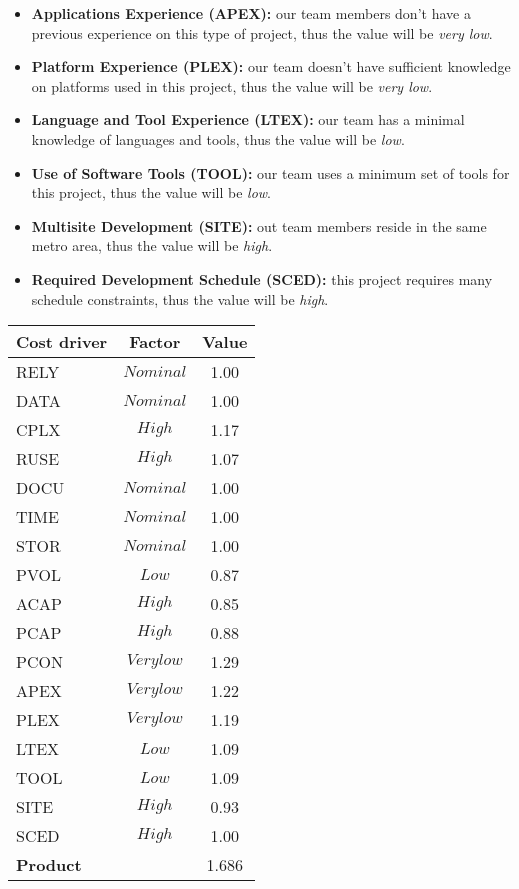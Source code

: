 \begin{itemize}
	\item\textbf{Applications Experience (APEX):} our team members don't have a previous experience on this type of project, thus the value will be \textit{very low}.
	
	\item\textbf{Platform Experience (PLEX):} our team  doesn't have sufficient knowledge on platforms used in this project, thus the value will be \textit{very low}.
	
	\item\textbf{Language and Tool Experience (LTEX):} our team has a minimal knowledge of languages and tools, thus the value will be \textit{low}.
	
	\item\textbf{Use of Software Tools (TOOL):} our team uses a minimum set of tools for this project, thus the value will be \textit{low}.
	
	\item\textbf{Multisite Development (SITE):} out team members reside in the same metro area, thus the value will be \textit{high}.
	
	\item\textbf{Required Development Schedule (SCED):} this project requires many schedule constraints, thus the value will be \textit{high}.
	
\end{itemize}

\vspace{10mm}

\begin{center}
	\begin{tabular}{| l | c | c |}
		\hline
		\textbf{Cost driver} & \textbf{Factor} & \textbf{Value} \\ \hline
		RELY & $Nominal$ & 1.00\\ \hline
		DATA & $Nominal$ & 1.00\\ \hline
		CPLX & $High$ & 1.17\\ \hline
		RUSE & $High$ & 1.07\\ \hline
		DOCU & $Nominal$ & 1.00\\ \hline
		TIME & $Nominal$ & 1.00\\ \hline
		STOR & $Nominal$ & 1.00\\ \hline
		PVOL & $Low$ & 0.87\\ \hline
		ACAP & $High$ & 0.85\\ \hline
		PCAP & $High$ & 0.88\\ \hline
		PCON & $Very low$ & 1.29\\ \hline
		APEX & $Very low$ & 1.22\\ \hline
		PLEX & $Very low$ & 1.19\\ \hline
		LTEX & $Low$ & 1.09\\ \hline
		TOOL & $Low$ & 1.09\\ \hline
		SITE & $High$ & 0.93\\ \hline
		SCED & $High$ & 1.00\\ \hline
		\multicolumn{2}{|l|}{\textbf{Product}} & 1.686\\ \hline
	\end{tabular}
\end{center}